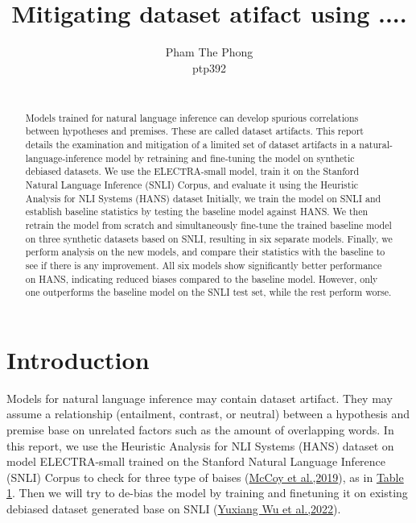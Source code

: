 \documentclass{article}
\title{Mitigating dataset atifact using ....}
\author{%
  Pham The Phong \\
  ptp392\\
   \\
}
\begin{document}
\maketitle


\begin{abstract}


 Models trained for natural language inference can develop spurious correlations between hypotheses and premises.
 These are called dataset artifacts.
  This report details the examination and mitigation of a limited set of dataset artifacts in a natural-language-inference model by retraining and fine-tuning the model on synthetic debiased datasets.
 We use the ELECTRA-small model, train it on the Stanford Natural Language Inference (SNLI) Corpus, and evaluate it using the Heuristic Analysis for NLI Systems (HANS) dataset
 Initially, we train the model on SNLI and establish baseline statistics by testing the baseline model against HANS.
  We then retrain the model from scratch and simultaneously fine-tune the trained baseline model on three synthetic datasets based on SNLI, resulting in six separate models.
  Finally, we perform analysis on the new models, and compare their statistics with the baseline to see if there is any improvement.
  All six models show significantly better performance on HANS, indicating reduced biases compared to the baseline model.
  However, only one outperforms the baseline model on the SNLI test set, while the rest perform worse.

\end{abstract}


\section{Introduction}
Models for natural language inference may contain dataset artifact.
They may assume a relationship (entailment, contrast, or neutral) between a hypothesis and premise base on unrelated factors such as the amount of overlapping words.
In this report, we use the Heuristic Analysis for NLI Systems (HANS) dataset on model ELECTRA-small trained on the Stanford Natural Language Inference (SNLI) Corpus to check for three type of baises (\hyperref[ref1]{McCoy et al.,2019}), as in \hyperref[table1]{Table 1}. Then we will try to de-bias the model by training and finetuning it on existing debiased dataset generated base on SNLI (\hyperref[ref2]{Yuxiang Wu et al.,2022}).
\end{document}
